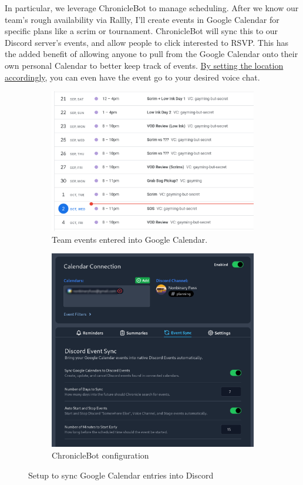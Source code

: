 \documentclass[12pt]{article}
\begin{document}
In particular, we leverage ChronicleBot to manage scheduling. After we know our team's rough availability via Rallly, I'll create events in Google Calendar for specific plans like a scrim or tournament. ChronicleBot will sync this to our Discord server's events, and allow people to click interested to RSVP. This has the added benefit of allowing anyone to pull from the Google Calendar onto their own personal Calendar to better keep track of events. \href{https://chroniclebot.com/docs/notifier/discord-event-sync#voice-channel-events}{By setting the location accordingly}, you can even have the event go to your desired voice chat.
\begin{figure}
\centering
\begin{subfigure}{.58\textwidth}
    \centering
    \includegraphics[width=.95\linewidth]{google_calendar.png}
    \caption{Team events entered into Google Calendar.}
\end{subfigure}%
\begin{subfigure}{.42\textwidth}
    \centering
    \includegraphics[width=.95\linewidth]{chronicle_bot.png}
    \caption{ChronicleBot configuration}
\end{subfigure}
\caption{Setup to sync Google Calendar entries into Discord}
\end{figure}
\end{document}
